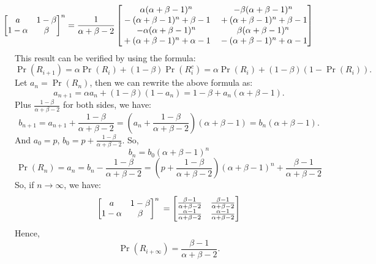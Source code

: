 \documentclass[14pt]{elegantbook}
\begin{document}
\begin{solution}
\begin{enumerate}[(a)]
\begin{align*}
                \hspace{-25pt}\begin{bmatrix}
                    a&1-\beta\\
                    1-\alpha&\beta
                \end{bmatrix}^n=\frac{1}{\alpha + \beta - 2}\begin{bmatrix}
                    \alpha (\alpha + \beta - 1)^n  & -\beta (\alpha + \beta - 1)^n  \\{}- (\alpha + \beta - 1)^n + \beta - 1 &{}+ (\alpha + \beta - 1)^n + \beta - 1\\
                    -\alpha (\alpha + \beta - 1)^n  &{} \beta (\alpha + \beta - 1)^n  \\{}+ (\alpha + \beta - 1)^n + \alpha - 1 &{}- (\alpha + \beta - 1)^n + \alpha - 1
                \end{bmatrix}
            \end{align*}
            This result can be verified by using the formula:
            \[\Pr(R_{i+1})=\alpha \Pr(R_{i})+(1-\beta)\Pr(R_{i}^c)=\alpha \Pr(R_{i})+(1-\beta)(1-\Pr(R_{i})). \]
            Let $a_{n}=\Pr(R_{n})$, then we can rewrite the above formula as:
            \[a_{n+1}=\alpha a_n+(1-\beta)(1-a_n)=1-\beta+a_n(\alpha+\beta-1). \]
            Plus $\frac{1-\beta}{\alpha+\beta-2}$ for both sides, we have:
            \[b_{n+1}=a_{n+1}+\frac{1-\beta}{\alpha+\beta-2}=\left(a_n+\frac{1-\beta}{\alpha+\beta-2}\right)(\alpha+\beta-1)=b_n(\alpha+\beta-1). \]
            And $a_0=p$, $b_0=p+\frac{1-\beta}{\alpha+\beta-2}$. So, 
            \[b_n=b_0(\alpha+\beta-1)^n\]
            \[\Pr(R_{n})=a_n=b_n-\frac{1-\beta}{\alpha+\beta-2}=\left(p+\frac{1-\beta}{\alpha+\beta-2}\right)(\alpha+\beta-1)^n+\frac{\beta-1}{\alpha+\beta-2}\]
            So, if $n\to\infty$, we have:
            \[\begin{bmatrix}
                a&1-\beta\\
                1-\alpha&\beta
            \end{bmatrix}^n\\=\begin{bmatrix}
                \frac{\beta-1}{\alpha+\beta-2}&\frac{\beta-1}{\alpha+\beta-2}\\
                \frac{\alpha-1}{\alpha+\beta-2}&\frac{\alpha-1}{\alpha+\beta-2}
            \end{bmatrix}\]
            Hence, \[
                \Pr(R_{i+\infty})=\frac{\beta-1}{\alpha+\beta-2}. 
            \]
        \end{enumerate}
    \end{solution}
    
\end{document}
